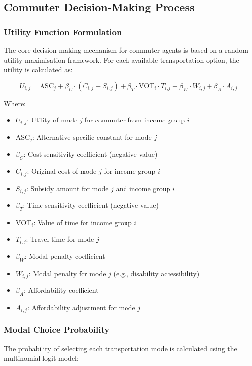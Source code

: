 \subsection{Commuter Decision-Making Process}
\subsubsection{Utility Function Formulation}
The core decision-making mechanism for commuter agents is based on a random utility maximisation framework. For each available transportation option, the utility is calculated as:

\begin{equation}
U_{i,j} = \text{ASC}_j + \beta_C \cdot (C_{i,j} - S_{i,j}) + \beta_T \cdot \text{VOT}_i \cdot T_{i,j} + \beta_W \cdot W_{i,j} + \beta_A \cdot A_{i,j}
\end{equation}

Where:
\begin{itemize}
    \item $U_{i,j}$: Utility of mode $j$ for commuter from income group $i$
    \item $\text{ASC}_j$: Alternative-specific constant for mode $j$
    \item $\beta_C$: Cost sensitivity coefficient (negative value)
    \item $C_{i,j}$: Original cost of mode $j$ for income group $i$
    \item $S_{i,j}$: Subsidy amount for mode $j$ and income group $i$
    \item $\beta_T$: Time sensitivity coefficient (negative value)
    \item $\text{VOT}_i$: Value of time for income group $i$
    \item $T_{i,j}$: Travel time for mode $j$
    \item $\beta_W$: Modal penalty coefficient
    \item $W_{i,j}$: Modal penalty for mode $j$ (e.g., disability accessibility)
    \item $\beta_A$: Affordability coefficient
    \item $A_{i,j}$: Affordability adjustment for mode $j$
\end{itemize}

\subsubsection{Modal Choice Probability}
The probability of selecting each transportation mode is calculated using the multinomial logit model:

